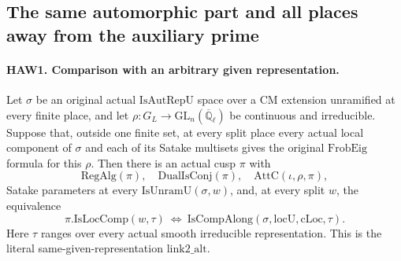 \subsection{The same automorphic part and all places away from the auxiliary prime}

\paragraph{HAW1. Comparison with an arbitrary given representation.}
\label{claim:HAW1}
Let $\sigma$ be an original actual $\mathrm{IsAutRepU}$ space
over a CM extension unramified at every finite place, and let
$\rho:G_L\to\mathrm{GL}_n(\overline{\mathbb Q}_\ell)$ be
continuous and irreducible.  Suppose that, outside one finite set,
at every split place every actual local component of $\sigma$
and each of its Satake multisets gives the original
$\mathrm{FrobEig}$ formula for this $\rho$.  Then there is an
actual cusp $\pi$ with
\[
 \mathrm{RegAlg}(\pi),\quad \mathrm{DualIsConj}(\pi),\quad
 \mathrm{AttC}(\iota,\rho,\pi),
 \tag{HAW.4}
\]
Satake parameters at every $\mathrm{IsUnramU}(\sigma,w)$,
and, at every split $w$, the equivalence
\[
 \pi.\mathrm{IsLocComp}(w,\tau)
 \ \Longleftrightarrow\
 \mathrm{IsCompAlong}(\sigma,\mathrm{locU},\mathrm{cLoc},\tau).
 \tag{HAW.5}
\]
Here $\tau$ ranges over every actual smooth irreducible representation.
This is the literal same-given-representation $\mathrm{link2\_alt}$.
